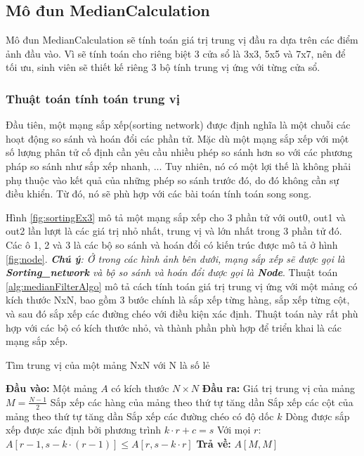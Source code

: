 \subsection{Mô đun MedianCalculation}
Mô đun MedianCalculation sẽ tính toán giá trị trung vị đầu ra dựa trên các điểm ảnh đầu vào. Vì sẽ tính toán cho riêng biệt 3 cửa sổ là 3x3, 5x5 và 7x7, nên để tối ưu, sinh viên sẽ thiết kế riêng 3 bộ tính trung vị ứng với từng cửa sổ.


\subsubsection{Thuật toán tính toán trung vị}
Đầu tiên, một mạng sắp xếp(sorting network) được định nghĩa là một chuỗi các hoạt động so sánh và hoán đổi các phần tử. Mặc dù một mạng sắp xếp với một số lượng phân tử cố định cần yêu cầu nhiều phép so sánh hơn so với các phương pháp so sánh như sắp xếp nhanh, ... Tuy nhiên, nó có một lợi thế là không phải phụ thuộc vào kết quả của những phép so sánh trước đó, do đó không cần sự điều khiển. Từ đó, nó sẽ phù hợp với các bài toán tính toán song song.


Hình \ref{fig:sortingEx3} mô tả một mạng sắp xếp cho 3 phần tử với out0, out1 và out2 lần lượt là các giá trị nhỏ nhất, trung vị và lớn nhất trong 3 phần tử đó. Các ô 1, 2 và 3 là các bộ so sánh và hoán đổi có kiến trúc được mô tả ở hình \ref{fig:node}. \textit{\textbf{Chú ý}: Ở trong các hình ảnh bên dưới, mạng sắp xếp sẽ được gọi là \textbf{Sorting\_network} và bộ so sánh và hoán đổi được gọi là \textbf{Node}}. Thuật toán \ref{alg:medianFilterAlgo} mô tả cách tính toán giá trị trung vị ứng với một mảng có kích thước NxN, bao gồm 3 bước chính là sắp xếp từng hàng, sắp xếp từng cột, và sau đó sắp xếp các đường chéo với điều kiện xác định. Thuật toán này rất phù hợp với các bộ có kích thước nhỏ, và thành phần phù hợp để triển khai là các mạng sắp xếp.

\begin{algorithm}
	\caption{Tìm trung vị của một mảng NxN với N là số lẻ \cite{altivec}}
	\begin{algorithmic}[1]
		\State \textbf{Đầu vào:} Một mảng $A$ có kích thước $N \times N$
		\State \textbf{Đầu ra:} Giá trị trung vị của mảng
		\State $M = \frac{N - 1}{2}$
		\State Sắp xếp các hàng của mảng theo thứ tự tăng dần
		\State Sắp xếp các cột của mảng theo thứ tự tăng dần
		\State Sắp xếp các đường chéo có độ dốc $k$
		\State Dòng được sắp xếp được xác định bởi phương trình $k \cdot r + c = s$
		\State Với mọi $r$: $A[r-1, s - k \cdot (r-1)] \leq A[r, s - k \cdot r]$
		\EndFor
		\EndFor
		\State \textbf{Trả về:} $A[M, M]$
	\end{algorithmic}
	\label{alg:medianFilterAlgo}
\end{algorithm}




